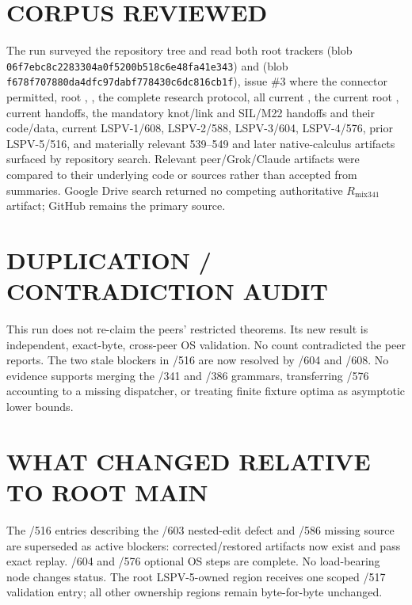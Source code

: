 \documentclass[11pt]{article}
\newcommand{\code}[1]{\texttt{#1}}
\begin{document}
\section{CORPUS REVIEWED}
The run surveyed the repository tree and read both root trackers
 (blob \code{06f7ebc8c2283304a0f5200b518c6e48fa41e343})
and  (blob
\code{f678f707880da4dfc97dabf778430c6dc816cb1f}), issue \#3 where the connector
permitted, root , , the complete research
protocol, all current , the current root , current
handoffs, the mandatory knot/link and SIL/M22 handoffs and their code/data,
current LSPV-1/608, LSPV-2/588, LSPV-3/604, LSPV-4/576, prior LSPV-5/516,
and materially relevant 539--549 and later native-calculus artifacts surfaced
by repository search.  Relevant peer/Grok/Claude artifacts were compared to
their underlying code or sources rather than accepted from summaries.
Google Drive search returned no competing authoritative $R_{\mathrm{mix341}}$
artifact; GitHub remains the primary source.

\section{DUPLICATION / CONTRADICTION AUDIT}
This run does not re-claim the peers' restricted theorems.  Its new result is
independent, exact-byte, cross-peer OS validation.  No count contradicted the
peer reports.  The two stale blockers in /516 are now resolved by /604 and
/608.  No evidence supports merging the /341 and /386 grammars, transferring
/576 accounting to a missing dispatcher, or treating finite fixture optima as
asymptotic lower bounds.

\section{WHAT CHANGED RELATIVE TO ROOT MAIN}
The /516 entries describing the /603 nested-edit defect and /586 missing source
are superseded as active blockers: corrected/restored artifacts now exist and
pass exact replay.  /604 and /576 optional OS steps are complete.  No
load-bearing node changes status.  The root LSPV-5-owned region receives one
scoped /517 validation entry; all other ownership regions remain byte-for-byte
unchanged.
\end{document}
